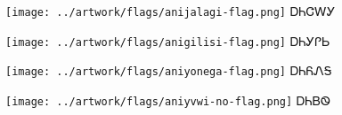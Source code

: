 \documentclass[avery5371]{flashcards}%
\begin{document}
\begin{flashcard}{
\texttt{[image: ../artwork/flags/anijalagi-flag.png]}
}\Huge ᎠᏂᏣᎳᎩ
\end{flashcard}

\begin{flashcard}{
\texttt{[image: ../artwork/flags/anigilisi-flag.png]}
}\Huge ᎠᏂᎩᎵᏏ
\end{flashcard}

\begin{flashcard}{
\texttt{[image: ../artwork/flags/aniyonega-flag.png]}
}\Huge ᎠᏂᏲᏁᎦ
\end{flashcard}

\begin{flashcard}{
\texttt{[image: ../artwork/flags/aniyvwi-no-flag.png]}
}\Huge ᎠᏂᏴᏫ
\end{flashcard}
\end{document}
